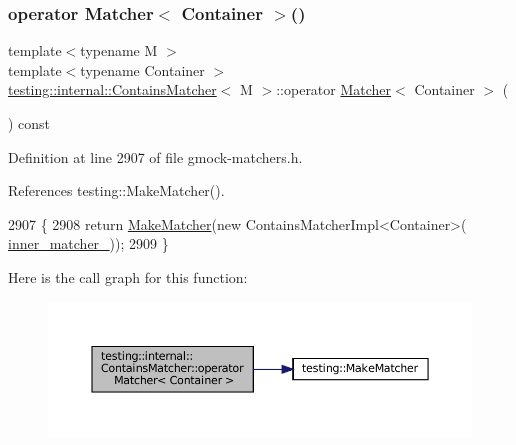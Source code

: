 \mbox{\label{classtesting_1_1internal_1_1ContainsMatcher_a18ed41b23e9d1cbc9c810baef7cf98a1}} 
\subsubsection{\texorpdfstring{operator Matcher$<$ Container $>$()}{operator Matcher< Container >()}}
{\footnotesize\ttfamily template$<$typename M $>$ \\
template$<$typename Container $>$ \\
\hyperlink{classtesting_1_1internal_1_1ContainsMatcher}{testing\+::internal\+::\+Contains\+Matcher}$<$ M $>$\+::operator \hyperlink{classtesting_1_1Matcher}{Matcher}$<$ Container $>$ (\begin{DoxyParamCaption}{ }\end{DoxyParamCaption}) const\hspace{0.3cm}{\ttfamily [inline]}}



Definition at line 2907 of file gmock-\/matchers.\+h.



References testing\+::\+Make\+Matcher().


\begin{DoxyCode}
2907                                       \{
2908     \textcolor{keywordflow}{return} \hyperlink{namespacetesting_a37fd8029ac00e60952440a3d9cca8166}{MakeMatcher}(\textcolor{keyword}{new} ContainsMatcherImpl<Container>(
      \hyperlink{classtesting_1_1internal_1_1ContainsMatcher_ab6b76656910ef5018783dc258dcb1f08}{inner\_matcher\_}));
2909   \}
\end{DoxyCode}
Here is the call graph for this function\+:
\nopagebreak
\begin{figure}[H]
\begin{center}
\leavevmode
\includegraphics[width=350pt]{classtesting_1_1internal_1_1ContainsMatcher_a18ed41b23e9d1cbc9c810baef7cf98a1_cgraph}
\end{center}
\end{figure}


